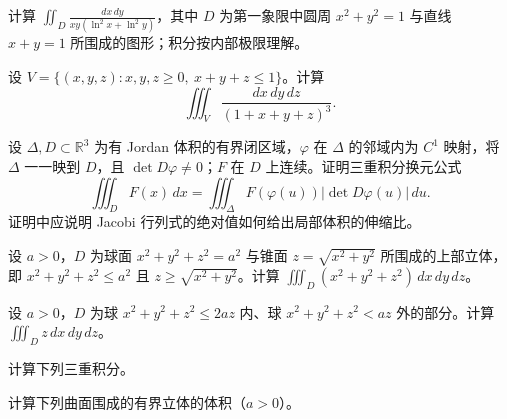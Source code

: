 \noindent\begin{minipage}{\textwidth}
计算 $\displaystyle\iint_D\frac{dx\,dy}{xy(\ln^2x+\ln^2y)}$，其中 $D$ 为第一象限中圆周 $x^2+y^2=1$ 与直线 $x+y=1$ 所围成的图形；积分按内部极限理解。
\end{minipage}\par\vfill
\noindent\begin{minipage}{\textwidth}
设 $V=\{(x,y,z):x,y,z\ge0,\ x+y+z\le1\}$。计算\[\iiint_V\frac{dx\,dy\,dz}{(1+x+y+z)^3}.\]
\end{minipage}\par\vfill
\newpage
\noindent\begin{minipage}{\textwidth}
设 $\Delta,D\subset\mathbb R^3$ 为有 Jordan 体积的有界闭区域，$\varphi$ 在 $\Delta$ 的邻域内为 $C^1$ 映射，将 $\Delta$ 一一映到 $D$，且 $\det D\varphi\ne0$；$F$ 在 $D$ 上连续。证明三重积分换元公式\[\iiint_DF(x)\,dx=\iiint_\Delta F(\varphi(u))|\det D\varphi(u)|\,du.\]证明中应说明 Jacobi 行列式的绝对值如何给出局部体积的伸缩比。
\end{minipage}\par\vfill
\noindent\begin{minipage}{\textwidth}
设 $a>0$，$D$ 为球面 $x^2+y^2+z^2=a^2$ 与锥面 $z=\sqrt{x^2+y^2}$ 所围成的上部立体，即 $x^2+y^2+z^2\le a^2$ 且 $z\ge\sqrt{x^2+y^2}$。计算 $\iiint_D(x^2+y^2+z^2)\,dx\,dy\,dz$。
\end{minipage}\par\vfill
\noindent\begin{minipage}{\textwidth}
设 $a>0$，$D$ 为球 $x^2+y^2+z^2\le2az$ 内、球 $x^2+y^2+z^2<az$ 外的部分。计算 $\iiint_Dz\,dx\,dy\,dz$。
\end{minipage}\par\vfill
\newpage
\noindent\begin{minipage}{\textwidth}
计算下列三重积分。
\end{minipage}\par\vfill
\noindent\begin{minipage}{\textwidth}
计算下列曲面围成的有界立体的体积（$a>0$）。
\end{minipage}\par\vfill
